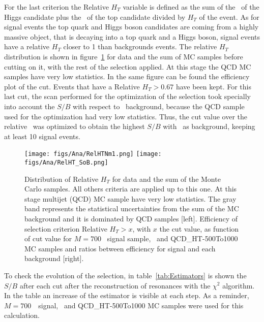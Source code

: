For the last criterion the Relative $H_{T}$ variable is defined as the sum of the \pt~of the Higgs candidate plus the \pt~of the top candidate divided by $H_{T}$ of the event. As for signal events the top quark and Higgs boson candidates are coming from a highly massive object, that is decaying into a top quark and a Higgs boson, signal events have a relative $H_{T}$ closer to 1 than backgrounds events. The relative $H_{T}$ distribution is shown in figure~\ref{fig:RelHtMass} for data and the sum of MC samples before cutting on it, with the rest of the selection applied. At this stage the QCD MC samples have very low statistics. In the same figure can be found the efficiency plot of the cut. Events that have a Relative $H_{T}>0.67$ have been kept. For this last cut, the scan performed for the optimization of the selection took specially into account the $S/B$ with respect to \ttbar~background, because the QCD sample used for the optimization had very low statistics. Thus, the cut value over the relative \HT~was optimized to obtain the highest $S/B$ with \ttbar~as background, keeping at least 10 signal events. 

\begin{figure}[!Hhtbp]
  \begin{center}
    \texttt{[image: figs/Ana/RelHTNm1.png]}
    \texttt{[image: figs/Ana/RelHT\_SoB.png]}
    \caption{Distribution of Relative $H_{T}$ for data and the sum of the Monte Carlo samples. All others criteria are applied up to this one. At this stage multijet (QCD) MC sample have very low statistics. The gray band represents the statistical uncertainties from the sum of the MC background and it is dominated by QCD samples [left]. Efficiency of selection criterion Relative $H_{T}>x$, with $x$ the cut value, as function of cut value for $M=700$ \GeVcc~signal sample, \ttbar~and QCD\_HT-500To1000 MC samples and ratios between efficiency for signal and each background [right]. }
    \label{fig:RelHtMass}
  \end{center}
\end{figure}

To check the evolution of the selection, in table~\ref{tab:Estimators} is shown the $S/B$ after each cut after the reconstruction of resonances with the $\chi^{2}$ algorithm. In the table an increase of the estimator is visible at each step. As a reminder, $M=700$~\GeVcc~signal, \ttbar~and QCD\_HT-500To1000 MC samples were used for this calculation. %

